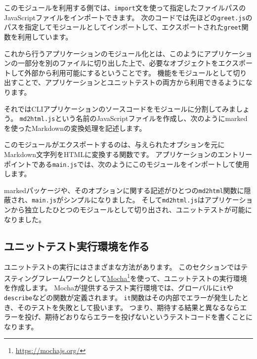 

このモジュールを利用する側では、\texttt{import}文を使って指定したファイルパスのJavaScriptファイルをインポートできます。
次のコードでは先ほどの\texttt{greet.js}のパスを指定してモジュールとしてインポートして、エクスポートされた\texttt{greet}関数を利用しています。



これから行うアプリケーションのモジュール化とは、このようにアプリケーションの一部分を別のファイルに切り出した上で、必要なオブジェクトをエクスポートして外部から利用可能にするということです。
機能をモジュールとして切り出すことで、アプリケーションとユニットテストの両方から利用できるようになります。

それではCLIアプリケーションのソースコードをモジュールに分割してみましょう。
\texttt{md2html.js}という名前のJavaScriptファイルを作成し、次のようにmarkedを使ったMarkdownの変換処理を記述します。



このモジュールがエクスポートするのは、与えられたオプションを元にMarkdown文字列をHTMLに変換する関数です。
アプリケーションのエントリーポイントである\texttt{main.js}では、次のようにこのモジュールをインポートして使用します。



markedパッケージや、そのオプションに関する記述がひとつの\texttt{md2html}関数に隠蔽され、\texttt{main.js}がシンプルになりました。
そして\texttt{md2html.js}はアプリケーションから独立したひとつのモジュールとして切り出され、ユニットテストが可能になりました。

\hypertarget{create-env}{%
\subsection{ユニットテスト実行環境を作る}\label{create-env}}

ユニットテストの実行にはさまざまな方法があります。
このセクションではテスティングフレームワークとして\href{https://mochajs.org/}{Mocha}\footnote{\url{https://mochajs.org/}}を使って、ユニットテストの実行環境を作成します。
Mochaが提供するテスト実行環境では、グローバルに\texttt{it}や\texttt{describe}などの関数が定義されます。
\texttt{it}関数はその内部でエラーが発生したとき、そのテストを失敗として扱います。
つまり、期待する結果と異なるならエラーを投げ、期待どおりならエラーを投げないというテストコードを書くことになります。

